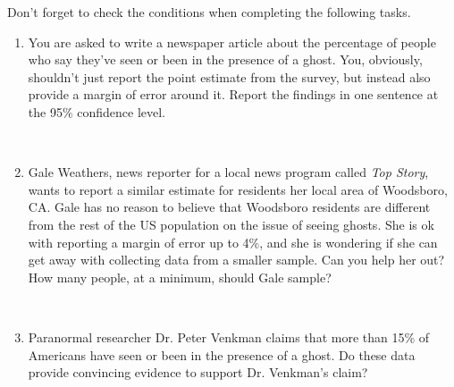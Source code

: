 \documentclass[11pt]{article}
\newcommand{\soln}[2]{$\:$\\ \vspace{#1}}{}
\begin{document}
Don't forget to check the conditions when completing the following tasks.

\begin{enumerate}

\item You are asked to write a newspaper article about the percentage of people who say they've seen or 
been in the presence of a ghost. You, obviously, shouldn't just report the point estimate from the survey, but instead 
also provide a margin of error around it. Report the findings in one sentence at the 95\% confidence level.

\soln{5cm}{
Conditions: (1) Independence: SRS + 2003 < 10\% of all americans, therefore whether or not one participant in the sample
has seen or been in the presence of ghost is independent of another in the sample. \\
(2) S: $2003 \times 0.18 = 360.54$ and F: $2003 \times 0.82 = 1642.46$, both greater than 10. \\
Therefore we can assume that the sampling distribution of Americans who say they have seen or been in the presence
of a ghost in samples of size 2,003 is nearly normal.\\
$SE = \sqrt{ \frac{ 0.18 \times 0.82 }{ 2003 } } = 0.0086$ \\
$0.18 \pm 1.96 \times 0.0086 = (0.164, 0.196)$ \\
We are 95\% confident that 16.4\% to 19.6\% of Americans have say they've seen or been in the presence of a ghost.
}

\item Gale Weathers, news reporter for a local news program called \textit{Top Story}, wants to report a similar estimate 
for residents her local area of Woodsboro, CA. Gale has no reason to believe that Woodsboro residents are different
from the rest of the US population on the issue of seeing ghosts. She is ok with reporting a margin of error up to 4\%, 
and she is wondering if she can get away with collecting data from a smaller sample. Can you help her out? How many 
people, at a minimum, should Gale sample?

\soln{5cm}{
$0.04 \ge 1.96 \sqrt{\frac{0.18 \times 0.82}{n}} \rightarrow n \ge 52.3$, At least 53.
}

\item Paranormal researcher Dr. Peter Venkman claims that more than 15\% of Americans have seen or been in the 
presence of a ghost. Do these data provide convincing evidence to support Dr. Venkman's claim?


\end{enumerate}
\end{document}
